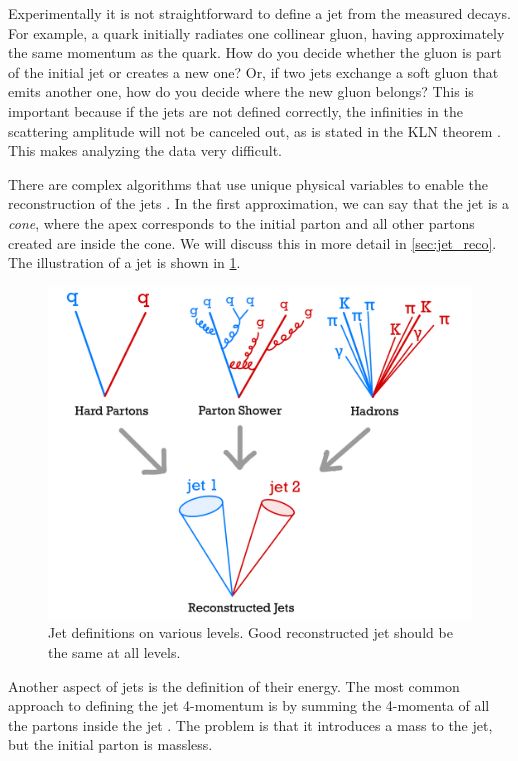 Experimentally it is not straightforward to define a jet from the measured decays.
For example, a quark initially radiates one collinear gluon, having approximately the same momentum as the quark.
How do you decide whether the gluon is part of the initial jet or creates a new one?
Or, if two jets exchange a soft gluon that emits another one, how do you decide where the new gluon belongs?
This is important because if the jets are not defined correctly, the infinities in the scattering amplitude will not be canceled out, as is stated in the KLN theorem \cite{IR_sing_K,IR_sing_LN}.
This makes analyzing the data very difficult. 

There are complex algorithms that use unique physical variables to enable the reconstruction of the jets \cite{antikt}.
In the first approximation, we can say that the jet is a \emph{cone}, where the apex corresponds to the initial parton and all other partons created are inside the cone. 
We will discuss this in more detail in \cref{sec:jet_reco}.
The illustration of a jet is shown in \cref{fig:jet}.
\begin{figure}[htb]
    \centering
    \includegraphics[width=1.\linewidth]{src/img/jet_reco.jpeg}
    \caption[Jet definitions on various levels.]{Jet definitions on various levels. Good reconstructed jet should be the same at all levels.}
    \label{fig:jet}
\end{figure}

Another aspect of jets is the definition of their energy.
The most common approach to defining the jet 4-momentum is by summing the 4-momenta of all the partons inside the jet \cite{antikt}.
The problem is that it introduces a mass to the jet, but the initial parton is massless.


